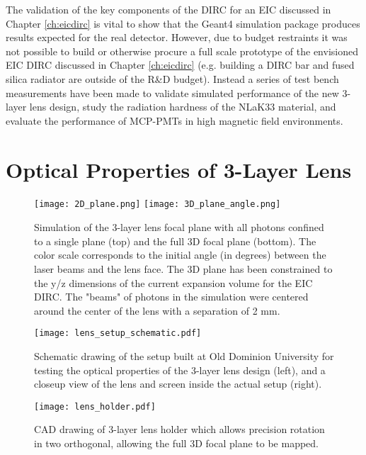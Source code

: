 \label{ch:components}
The validation of the key components of the DIRC for an EIC discussed in Chapter \ref{ch:eicdirc} is vital to show that the Geant4 simulation package produces results expected for the real detector. However, due to budget restraints it was not possible to build or otherwise procure a full scale prototype of the envisioned EIC DIRC discussed in Chapter \ref{ch:eicdirc} (e.g. building a DIRC bar and fused silica radiator are outside of the R\&D budget). Instead a series of test bench measurements have been made to validate simulated performance of the new 3-layer lens design, study the radiation hardness of the NLaK33 material, and evaluate the performance of MCP-PMTs in high magnetic field environments.

\section{Optical Properties of 3-Layer Lens}
\begin{figure}[!htb]
	\centering
	\texttt{[image: 2D\_plane.png]}
	\texttt{[image: 3D\_plane\_angle.png]}
	\caption{Simulation of the 3-layer lens focal plane with all photons confined to a single plane (top) and the full 3D focal plane (bottom). The color scale corresponds to the initial angle (in degrees) between the laser beams and the lens face. The 3D plane has been constrained to the y/z dimensions of the current expansion volume for the EIC DIRC. The "beams" of photons in the simulation were centered around the center of the lens with a separation of 2 mm.}
	\label{fig:focalplane_sim}
\end{figure}
\begin{figure}[!htb]
	\centering
	\texttt{[image: lens\_setup\_schematic.pdf]}
	\caption{Schematic drawing of the setup built at Old Dominion University for testing the optical properties of the 3-layer lens design (left), and a closeup view of the lens and screen inside the actual setup (right).}
	\label{fig:ODU_setup}
\end{figure}

\begin{figure}[!htb]
	\centering
	\texttt{[image: lens\_holder.pdf]}
	\caption{CAD drawing of 3-layer lens holder which allows precision rotation in two orthogonal, allowing the full 3D focal plane to be mapped.}
	\label{fig:lens_holder}
\end{figure}

